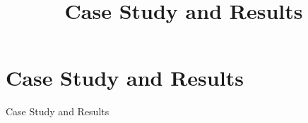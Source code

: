 \section{Case Study and Results}
\title{Case Study and Results}
\begin{frame}{Case Study and Results}
    \begin{columns}
        
        
    \end{columns}
\end{frame}


